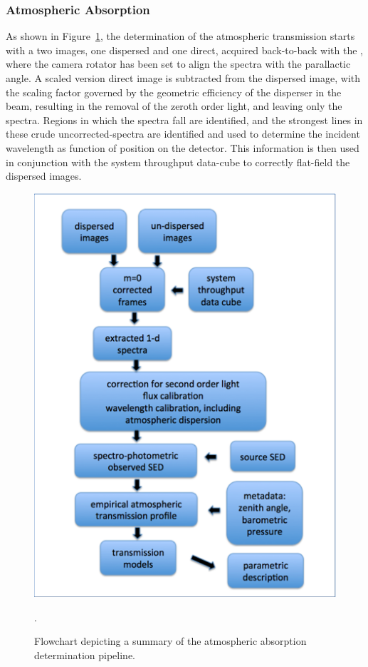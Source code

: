 \subsubsection{Atmospheric Absorption}\label{sec:CPP:aux:atmosphericAbsorption}
As shown in Figure~\ref{fig:aux_telescope}, the determination of the atmospheric transmission starts with a two images, one dispersed and one direct, acquired back-to-back with the \auxtelescope, where the camera rotator has been set to align the spectra with the parallactic angle. A scaled version direct image is subtracted from the dispersed image, with the scaling factor governed by the geometric efficiency of the disperser in the beam, resulting in the removal of the zeroth order light, and leaving only the spectra. Regions in which the spectra fall are identified, and the strongest lines in these crude uncorrected-spectra are identified and used to determine the incident wavelength as function of position on the detector. This information is then used in conjunction with the system throughput data-cube to correctly flat-field the dispersed images.

\begin{figure}
	\centering
	\includegraphics[width=\textwidth]{figures/aux_telescope_workflow.png}
	\caption{Flowchart depicting a summary of the atmospheric absorption determination pipeline.}.
	\label{fig:aux_telescope}
\end{figure}

